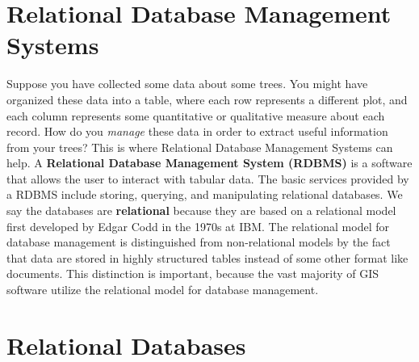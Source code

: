 \documentclass[
]{book}
\begin{document}
\hypertarget{relational-database-management-systems}{%
\section{Relational Database Management Systems}\label{relational-database-management-systems}}

Suppose you have collected some data about some trees. You might have organized these data into a table, where each row represents a different plot, and each column represents some quantitative or qualitative measure about each record. How do you \emph{manage} these data in order to extract useful information from your trees? This is where Relational Database Management Systems can help. A \textbf{Relational Database Management System (RDBMS)} is a software that allows the user to interact with tabular data. The basic services provided by a RDBMS include storing, querying, and manipulating relational databases. We say the databases are \textbf{relational} because they are based on a relational model first developed by Edgar Codd in the 1970s at IBM. The relational model for database management is distinguished from non-relational models by the fact that data are stored in highly structured tables instead of some other format like documents. This distinction is important, because the vast majority of GIS software utilize the relational model for database management.

\hypertarget{relational-databases-1}{%
\section{Relational Databases}\label{relational-databases-1}}
\end{document}
